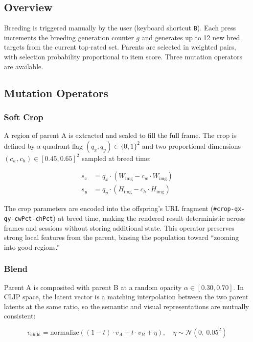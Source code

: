 \documentclass[12pt, a4paper]{article}
\begin{document}
\subsection{Overview}

Breeding is triggered manually by the user (keyboard shortcut \texttt{B}). Each press increments the breeding generation counter $g$ and generates up to 12 new bred targets from the current top-rated set. Parents are selected in weighted pairs, with selection probability proportional to item score. Three mutation operators are available.

\subsection{Mutation Operators}

\subsubsection{Soft Crop}

A region of parent A is extracted and scaled to fill the full frame. The crop is defined by a quadrant flag $(q_x, q_y) \in \{0,1\}^2$ and two proportional dimensions $(c_w, c_h) \in [0.45, 0.65]^2$ sampled at breed time:

\begin{align}
s_x &= q_x \cdot (W_{\text{img}} - c_w \cdot W_{\text{img}}) \\
s_y &= q_y \cdot (H_{\text{img}} - c_h \cdot H_{\text{img}})
\end{align}

The crop parameters are encoded into the offspring's URL fragment (\texttt{\#crop-qx-qy-cwPct-chPct}) at breed time, making the rendered result deterministic across frames and sessions without storing additional state. This operator preserves strong local features from the parent, biasing the population toward ``zooming into good regions.''

\subsubsection{Blend}

Parent A is composited with parent B at a random opacity $\alpha \in [0.30, 0.70]$. In CLIP space, the latent vector is a matching interpolation between the two parent latents at the same ratio, so the semantic and visual representations are mutually consistent:

\begin{equation}
v_{\text{child}} = \text{normalize}\left( (1-t) \cdot v_A + t \cdot v_B + \eta \right), \quad \eta \sim \mathcal{N}(0,\ 0.05^2)
\end{equation}
\end{document}
